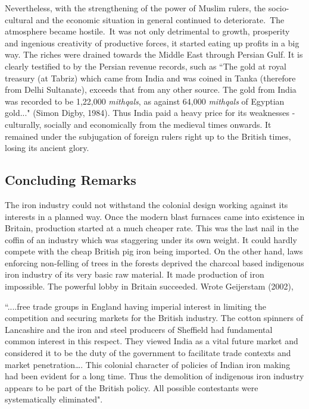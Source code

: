 Nevertheless, with the strengthening of the power of Muslim rulers, the socio-cultural and the economic situation in general continued to deteriorate.~The atmosphere became hostile.~It was not only detrimental to growth, prosperity and ingenious creativity of productive forces, it started eating up profits in a big way. The riches were drained towards the Middle East through Persian Gulf. It is clearly testified to by the Persian revenue records, such as \footnotesize{``The gold at royal treasury (at Tabriz) which came from India and was coined in Tanka (therefore from Delhi Sultanate), exceeds that from any other source. The gold from India was recorded to be 1,22,000 {\it mithqals}, as against 64,000 {\it mithqals} of Egyptian gold..."} (Simon Digby, 1984). Thus India paid a heavy price for its weaknesses - culturally, socially and economically from the medieval times onwards. It remained under the subjugation of foreign rulers right up to the British times, losing its ancient glory.

\vspace{-.3cm}

\subsection*{Concluding Remarks}\label{chapter8-subsection-9}

\vspace{-.2cm}

The iron industry could not withstand the colonial design working against its interests in a planned way. Once the modern blast furnaces came into existence in Britain, production started at a much cheaper rate. This was the last nail in the coffin of an industry which was staggering under its own weight. It could hardly compete with the cheap British pig iron being imported. On the other hand, laws enforcing non-felling of trees in the forests deprived the charcoal based indigenous iron industry of its very basic raw material. It made production of iron impossible. The powerful lobby in Britain succeeded. Wrote Geijerstam (2002),

 \footnotesize{“....free trade groups in England having imperial interest in limiting the competition and securing markets for the British industry. The cotton spinners of Lancashire and the iron and steel producers of Sheffield had fundamental common interest in this respect. They viewed India as a vital future market and considered it to be the duty of the government to facilitate trade contexts and market penetration…. This colonial character of policies of Indian iron making had been evident for a long time. Thus the demolition of indigenous iron industry appears to be part of the British policy. All possible contestants were systematically eliminated".} 

